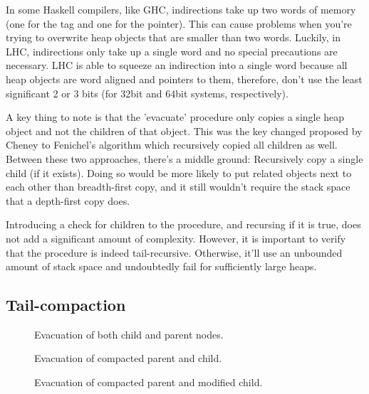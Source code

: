 \documentclass[a4paper,oneside]{memoir}
\begin{document}
In some Haskell compilers, like GHC, indirections take up two words of memory
(one for the tag and one for the pointer). This can cause problems when you're
trying to overwrite heap objects that are smaller than two words. Luckily, in
LHC, indirections only take up a single word and no special precautions are
necessary. LHC is able to squeeze an indirection into a single word because
all heap objects are word aligned and pointers to them, therefore, don't use the
least significant 2 or 3 bits (for 32bit and 64bit systems, respectively).

A key thing to note is that the 'evacuate' procedure only copies a single heap
object and not the children of that object. This was the key changed proposed
by Cheney to Fenichel's algorithm which recursively copied all children as well.
\cite{Fenichel,Cheney:1970} Between these two approaches, there's a middle
ground: Recursively copy a single child (if it exists). Doing so would be more
likely to put related objects next to each other than breadth-first copy, and
it still wouldn't require the stack space that a depth-first copy does.

Introducing a check for children to the procedure, and recursing if it is true,
does not add a significant amount of complexity. However, it is important to
verify that the procedure is indeed tail-recursive. Otherwise, it'll use an
unbounded amount of stack space and undoubtedly fail for sufficiently large
heaps.


\subsection{Tail-compaction}
\label{tail-compaction-section}

\begin{figure}[t]
  
  \caption{Evacuation of both child and parent nodes.}
  \label{parent_child}
\end{figure}

\begin{figure}[b]
  
  \caption{Evacuation of compacted parent and child.}
  \label{compacted_parent_child}
\end{figure}

\begin{figure}[t]
  
  \caption{Evacuation of compacted parent and modified child.}
  \label{modified_child}
\end{figure}
\end{document}
